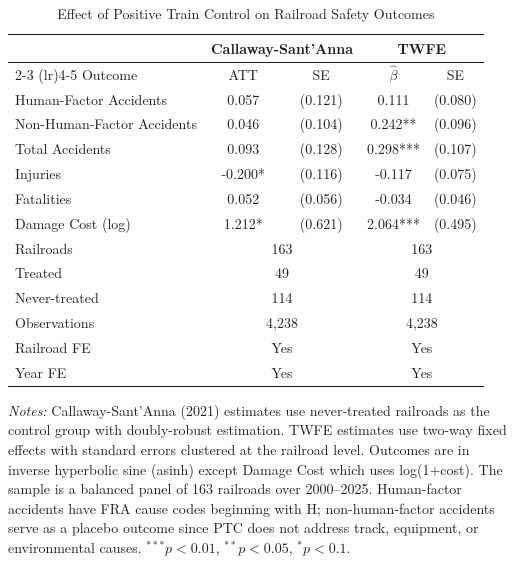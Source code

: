 \begin{table}[!t]
\centering
\caption{Effect of Positive Train Control on Railroad Safety Outcomes}
\label{tab:main}
\small
\begin{tabular}{lcccc}
\toprule
& \multicolumn{2}{c}{Callaway-Sant'Anna} & \multicolumn{2}{c}{TWFE} \\
\cmidrule(lr){2-3} \cmidrule(lr){4-5}
Outcome & ATT & SE & $\hat{\beta}$ & SE \\
\midrule
Human-Factor Accidents & 0.057 & (0.121) & 0.111 & (0.080) \\
Non-Human-Factor Accidents & 0.046 & (0.104) & 0.242** & (0.096) \\
Total Accidents & 0.093 & (0.128) & 0.298*** & (0.107) \\
Injuries & -0.200* & (0.116) & -0.117 & (0.075) \\
Fatalities & 0.052 & (0.056) & -0.034 & (0.046) \\
Damage Cost (log) & 1.212* & (0.621) & 2.064*** & (0.495) \\
\midrule
Railroads & \multicolumn{2}{c}{163} & \multicolumn{2}{c}{163} \\
\quad Treated & \multicolumn{2}{c}{49} & \multicolumn{2}{c}{49} \\
\quad Never-treated & \multicolumn{2}{c}{114} & \multicolumn{2}{c}{114} \\
Observations & \multicolumn{2}{c}{4,238} & \multicolumn{2}{c}{4,238} \\
Railroad FE & \multicolumn{2}{c}{Yes} & \multicolumn{2}{c}{Yes} \\
Year FE & \multicolumn{2}{c}{Yes} & \multicolumn{2}{c}{Yes} \\
\bottomrule
\end{tabular}
\par\vspace{0.3em}
\parbox{\textwidth}{\footnotesize
\textit{Notes:} Callaway-Sant'Anna (2021) estimates use never-treated railroads as the control group with doubly-robust estimation. TWFE estimates use two-way fixed effects with standard errors clustered at the railroad level. Outcomes are in inverse hyperbolic sine (asinh) except Damage Cost which uses log(1+cost). The sample is a balanced panel of 163 railroads over 2000--2025. Human-factor accidents have FRA cause codes beginning with H; non-human-factor accidents serve as a placebo outcome since PTC does not address track, equipment, or environmental causes.
$^{***}p<0.01$, $^{**}p<0.05$, $^{*}p<0.1$.
}
\end{table}
